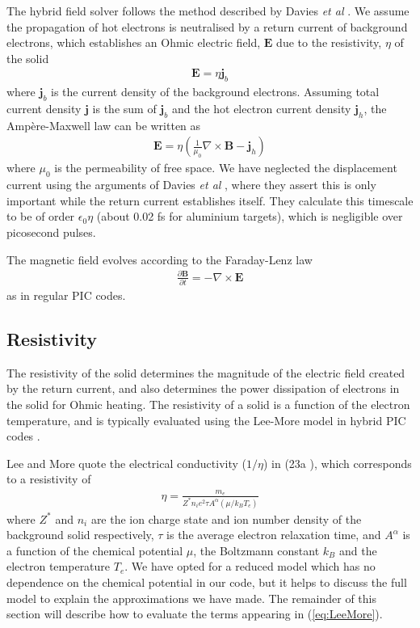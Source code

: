 \documentclass[12pt]{article}
\numberwithin{equation}{section}
\begin{document}
The hybrid field solver follows the method described by Davies \textit{et al} \cite{hybrid:Davies:1997, hybrid:Davies:2002}. We assume the propagation of hot electrons is neutralised by a return current of background electrons, which establishes an Ohmic electric field, $\textbf{E}$ due to the resistivity, $\eta$ of the solid
%
\begin{align} 
	\textbf{E} = \eta \textbf{j}_b
\end{align}
%
where $\textbf{j}_b$ is the current density of the background electrons. Assuming total current density $\textbf{j}$ is the sum of $\textbf{j}_b$ and the hot electron current density $\textbf{j}_h$, the Amp\`{e}re-Maxwell law can be written as
%
\begin{align} \label{eq:field:E}
	\textbf{E} = \eta \left( \frac{1}{\mu_0}\nabla\times\textbf{B} - \textbf{j}_h \right)
\end{align}
%
where $\mu_0$ is the permeability of free space. We have neglected the displacement current using the arguments of Davies \textit{et al} \cite{hybrid:Davies:1997}, where they assert this is only important while the return current establishes itself. They calculate this timescale to be of order $\epsilon_0\eta$ (about 0.02 fs for aluminium targets), which is negligible over picosecond pulses.

The magnetic field evolves according to the Faraday-Lenz law
%
\begin{align} \label{eq:field:B}
	\frac{\partial\textbf{B}}{\partial t} = -\nabla \times \textbf{E}
\end{align}
%
as in regular PIC codes.

\subsection{Resistivity} \label{sec:theory:resistivity}

The resistivity of the solid determines the magnitude of the electric field created by the return current, and also determines the power dissipation of electrons in the solid for Ohmic heating. The resistivity of a solid is a function of the electron temperature, and is typically evaluated using the Lee-More model in hybrid PIC codes \cite{eta:LeeMore}.

Lee and More quote the electrical conductivity ($1/\eta$) in (23a \cite{eta:LeeMore}), which corresponds to a resistivity of 
%
\begin{align} \label{eq:LeeMore}
    \eta = \frac{m_e}{Z^*n_i e^2 \tau A^{\alpha}(\mu/k_BT_e)}
\end{align}  
%
where $Z^*$ and $n_i$ are the ion charge state and ion number density of the background solid respectively, $\tau$ is the average electron relaxation time, and $A^\alpha$ is a function of the chemical potential $\mu$, the Boltzmann constant $k_B$ and the electron temperature $T_e$. We have opted for a reduced model which has no dependence on the chemical potential in our code, but it helps to discuss the full model to explain the approximations we have made. The remainder of this section will describe how to evaluate the terms appearing in (\ref{eq:LeeMore}).
\end{document}
